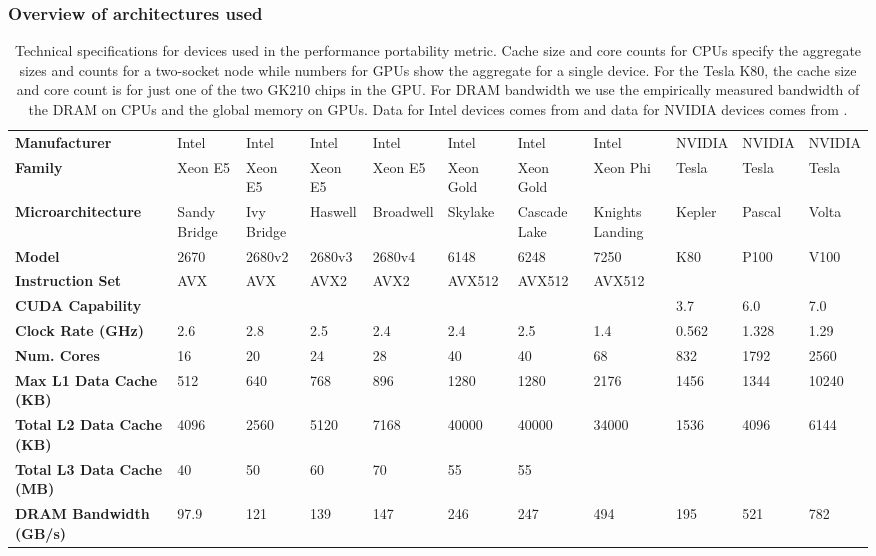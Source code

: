 \documentclass[10pt,journal,compsoc]{IEEEtran}
\begin{document}
\subsubsection{Overview of architectures used}
\label{sec:arch}
\begin{table}[!htbp]
\renewcommand{\arraystretch}{1.3}
\caption{
  Technical specifications for devices used in the performance portability
  metric. Cache size and core counts for CPUs specify the aggregate sizes and
  counts for a two-socket node while numbers for GPUs show the aggregate for a
  single device. For the Tesla K80, the cache size and core count is for just
  one of the two GK210 chips in the GPU. For DRAM bandwidth we use the
  empirically measured bandwidth of the DRAM on CPUs and the global memory on
  GPUs. Data for Intel devices comes from \cite{intel_optimization_manual} and
  data for NVIDIA devices comes from
  \cite{kepler_whitepaper,pascal_whitepaper,volta_whitepaper,jia_dissecting_2018}.
  }
\label{tab:device_specifications}
\centering
  \scriptsize
\begin{tabular}{ l | p{1.10cm} p{1.10cm} p{1.10cm} p{1.10cm} p{1.10cm} p{1.10cm} p{1.10cm} p{1.10cm} p{1.10cm} p{1.10cm}  }
\bfseries Manufacturer & Intel & Intel & Intel & Intel & Intel & Intel & Intel & NVIDIA & NVIDIA & NVIDIA\\
\bfseries Family & Xeon E5 & Xeon E5 & Xeon E5 & Xeon E5 & Xeon Gold & Xeon Gold & Xeon Phi & Tesla & Tesla & Tesla\\
\bfseries Microarchitecture & Sandy Bridge & Ivy Bridge & Haswell & Broadwell & Skylake & Cascade Lake & Knights Landing & Kepler & Pascal & Volta\\
\bfseries Model & 2670 & 2680v2 & 2680v3 & 2680v4 & 6148 & 6248 & 7250 & K80 & P100 & V100\\
\bfseries Instruction Set & AVX & AVX & AVX2 & AVX2 & AVX512 & AVX512 & AVX512 &  &  & \\
\bfseries CUDA Capability &  &  &  &  &  &  &  & 3.7 & 6.0 & 7.0\\
\bfseries Clock Rate (GHz)& 2.6 & 2.8 & 2.5 & 2.4 & 2.4 & 2.5 & 1.4 & 0.562 & 1.328 & 1.29\\
\bfseries Num. Cores & 16 & 20 & 24 & 28 & 40 & 40 & 68 & 832 & 1792 & 2560\\
\bfseries Max L1 Data Cache (KB)& 512 & 640 & 768 & 896 & 1280 & 1280 & 2176 & 1456 & 1344 & 10240\\
\bfseries Total L2 Data Cache (KB)& 4096 & 2560 & 5120 & 7168 & 40000 & 40000 & 34000 & 1536 & 4096 & 6144\\
\bfseries Total L3 Data Cache (MB)& 40 & 50 & 60 & 70 & 55 & 55 &  &  &  & \\
\bfseries DRAM Bandwidth (GB/s)& 97.9 & 121 & 139 & 147 & 246 & 247 & 494 & 195 & 521 & 782
\end{tabular}
\end{table}
\end{document}
